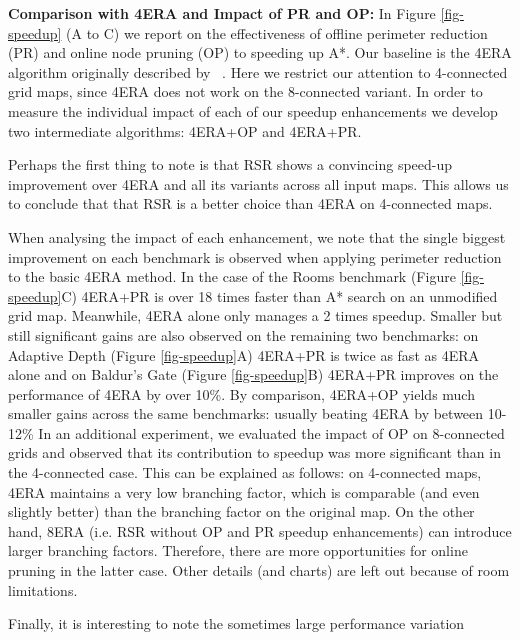 \textbf{Comparison with 4ERA and Impact of PR and OP:}
In Figure \ref{fig-speedup} (A to C) we report on the 
effectiveness of offline perimeter reduction (PR) and online 
node pruning (OP) to speeding up A*.
Our baseline is the 4ERA algorithm originally described by \citeauthor{harabor10}~.
Here we restrict our attention to 4-connected grid maps,
since 4ERA does not work on the 8-connected variant.
In order to measure the individual impact of each of our speedup enhancements
we develop two intermediate algorithms: 4ERA+OP and 4ERA+PR.
\par
Perhaps the first thing to note is that RSR shows a convincing 
speed-up improvement over 4ERA and all its variants across all input maps.
This allows us to conclude that that RSR is a better choice than 4ERA on
4-connected maps.
\par
When analysing the impact of each enhancement,
we note that the single biggest improvement on each
benchmark is observed when applying perimeter reduction to the basic 4ERA method.
In the case of the Rooms benchmark (Figure \ref{fig-speedup}C) 4ERA+PR is over
18 times faster than A* search on an unmodified grid map.
Meanwhile, 4ERA alone only manages a 2 times speedup.
Smaller but still significant gains are also observed on the remaining two benchmarks:
on Adaptive Depth (Figure \ref{fig-speedup}A) 4ERA+PR is twice as fast as 4ERA alone
and on Baldur's Gate (Figure \ref{fig-speedup}B) 4ERA+PR improves on
the performance of 4ERA by over 10\%.
By comparison, 4ERA+OP yields much smaller gains across the same
benchmarks: usually beating 4ERA by between 10-12\%
In an additional experiment, we evaluated the impact of OP on 8-connected
grids and observed that its contribution to speedup was more significant than in 
the 4-connected case.
This can be explained as follows: on 4-connected maps, 4ERA maintains a very low
branching factor, which is comparable (and even slightly better) than the branching
factor on the original map. 
On the other hand, 8ERA (i.e. RSR without OP and PR speedup enhancements) 
can introduce larger branching factors. Therefore, there are more opportunities for 
online pruning in the latter case. 
Other details (and charts) are left out because of room limitations.
\par
Finally, it is interesting to note the sometimes large performance variation 
